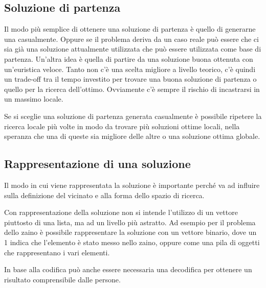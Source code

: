 

\subsection{Soluzione di partenza}

Il modo più semplice di ottenere una soluzione di partenza è quello di generarne una casualmente. Oppure se il problema deriva da un caso reale può essere che ci sia già una soluzione attualmente utilizzata che può essere utilizzata come base di partenza.
Un'altra idea è quella di partire da una soluzione buona ottenuta con un'euristica veloce. Tanto non c'è una scelta migliore a livello teorico, c'è quindi un trade-off tra il tempo investito per trovare una buona soluzione di partenza o quello per la ricerca dell'ottimo.
Ovviamente c'è sempre il rischio di incastrarsi in un massimo locale.

Se si sceglie una soluzione di partenza generata casualmente è possibile ripetere la ricerca locale più volte in modo da trovare più soluzioni ottime locali, nella speranza che una di queste sia migliore delle altre o una soluzione ottima globale.

\subsection{Rappresentazione di una soluzione}

Il modo in cui viene rappresentata la soluzione è importante perché va ad influire sulla definizione del vicinato e alla forma dello spazio di ricerca.

Con rappresentazione della soluzione non si intende l'utilizzo di un vettore piuttosto di una lista, ma ad un livello più astratto.
Ad esempio per il problema dello zaino è possibile rappresentare la soluzione con un vettore binario, dove un 1 indica che l'elemento è stato messo nello zaino, oppure come una pila di oggetti che rappresentano i vari elementi.

In base alla codifica può anche essere necessaria una decodifica per ottenere un risultato comprensibile dalle persone.

